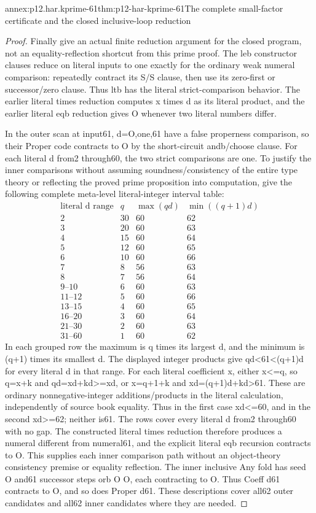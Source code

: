 \begin{annexitem}{annex:p12.har.kprime-61}{thm:p12-har-kprime-61}{The complete small-factor certificate and the closed inclusive-loop reduction}
\begin{proof}
Finally give an actual finite reduction argument for the closed program,
not an equality-reflection shortcut from this prime proof. The leb
constructor clauses reduce on literal inputs to one exactly for the
ordinary weak numeral comparison: repeatedly contract its S/S clause,
then use its zero-first or successor/zero clause. Thus ltb has the
literal strict-comparison behavior. The earlier literal times reduction
computes x times d as its literal product, and the earlier literal
eqb reduction gives O whenever two literal numbers differ.

In the outer scan at input61, d=O,one,61 have a false properness
comparison, so their Proper code contracts to O by the short-circuit
andb/choose clause. For each literal d from2 through60, the two
strict comparisons are one. To justify the inner comparisons without
assuming soundness/consistency of the entire type theory or reflecting
the proved prime proposition into computation, give the following
complete meta-level literal-integer interval table:
\[
\begin{array}{c|c|c|c}
 \text{literal d range}&q&\max(qd)&\min((q+1)d)\\\hline
 2&30&60&62\\
 3&20&60&63\\
 4&15&60&64\\
 5&12&60&65\\
 6&10&60&66\\
 7&8&56&63\\
 8&7&56&64\\
 9\text{--}10&6&60&63\\
 11\text{--}12&5&60&66\\
 13\text{--}15&4&60&65\\
 16\text{--}20&3&60&64\\
 21\text{--}30&2&60&63\\
 31\text{--}60&1&60&62
\end{array}
\]
In each grouped row the maximum is q times its largest d, and the
minimum is (q+1) times its smallest d. The displayed integer products
give qd<61<(q+1)d for every literal d in that range.
For each literal coefficient x, either x<=q, so q=x+k and
qd=xd+kd>=xd, or x=q+1+k and xd=(q+1)d+kd>61.
These are ordinary nonnegative-integer additions/products in the
literal calculation, independently of source book equality. Thus in
the first case xd<=60, and in the second xd>=62; neither is61.
The rows cover every literal d from2 through60 with no gap.
The constructed literal times reduction therefore produces a numeral
different from numeral61, and the explicit literal eqb recursion
contracts to O. This supplies each inner comparison path without
an object-theory consistency premise or equality reflection.
The inner inclusive Any fold has seed O and61 successor
steps orb O O, each contracting to O. Thus Coeff d61 contracts
to O, and so does Proper d61. These descriptions cover all62
outer candidates and all62 inner candidates where they are needed.


\end{proof}
\end{annexitem}
